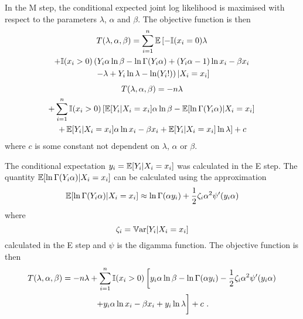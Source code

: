 In the M step, the conditional expected joint log likelihood is maximised with respect to the parameters $\lambda$, $\alpha$ and $\beta$. The objective function is then
\begin{multline*}
	T(\lambda,\alpha,\beta)=
	\sum_{i=1}^n
	\operatorname{\mathbb{E}}\left[
		-\mathbb{I}(x_i=0)
		\lambda
	\right.
	\\
	\left.+
		\mathbb{I}(x_i>0)
		\left(
			Y_i\alpha\ln\beta-\ln\Gamma(Y_i\alpha)+(Y_i\alpha-1)\ln x_i - \beta x_i
		\right.
	\right.
	\\
	\left.
		\left.	
			- \lambda + Y_i \ln \lambda - \ln(Y_i!)
		\right)
		|X_i=x_i
	\right]
\end{multline*}
\begin{multline*}
	T(\lambda,\alpha,\beta)=
	-n\lambda
	\\
	+\sum_{i=1}^n
	\mathbb{I}(x_i>0)
	\left[
		\operatorname{\mathbb{E}}[Y_i|X_i=x_i]\alpha\ln\beta-\operatorname{\mathbb{E}}[\ln\Gamma(Y_i\alpha)|X_i=x_i]
	\right.
	\\
	\left.
		+\operatorname{\mathbb{E}}[Y_i|X_i=x_i]\alpha\ln x_i - \beta x_i
		+ \operatorname{\mathbb{E}}[Y_i|X_i=x_i] \ln \lambda
	\right] + c
\end{multline*}
where $c$ is some constant not dependent on $\lambda$, $\alpha$ or $\beta$.

The conditional expectation $y_i = \operatorname{\mathbb{E}}[Y_i|X_i=x_i]$ was calculated in the E step. The quantity $\operatorname{\mathbb{E}}[\ln\Gamma(Y_i\alpha)|X_i=x_i]$ can be calculated using the approximation
\begin{equation}
	\operatorname{\mathbb{E}}[\ln\Gamma(Y_i\alpha)|X_i=x_i] \approx
	\ln\Gamma(\alpha y_i) + \frac{1}{2}\zeta_i\alpha^2\psi'(y_i\alpha)
\end{equation}
where
\begin{equation}
	\zeta_i = \operatorname{\mathbb{V}ar}[Y_i|X_i=x_i]
\end{equation}
calculated in the E step and $\psi$ is the digamma function. The objective function is then
\begin{multline}
	T(\lambda,\alpha,\beta)=
	-n\lambda
	+\sum_{i=1}^n
	\mathbb{I}(x_i>0)
	\left[
		y_i\alpha\ln\beta-\ln\Gamma(\alpha y_i) - \frac{1}{2}\zeta_i\alpha^2\psi'(y_i\alpha)
	\right.
	\\
	\left.
		+y_i\alpha\ln x_i - \beta x_i
		+ y_i \ln \lambda
		\vphantom{\frac{1}{1}}
	\right]
	+ c
	\ .
\end{multline}

